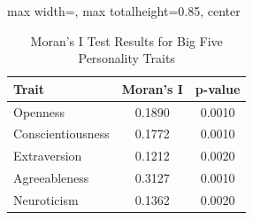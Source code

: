 \begin{table}[htbp]
\centering
\caption{Moran's I Test Results for Big Five Personality Traits}
\label{tab:morans_i_results}
\begin{adjustbox}{max width=\linewidth, max totalheight=0.85\textheight, center}
\begin{tabular}{lcc}
\toprule
Trait & Moran's I & p-value \\
\midrule
Openness & 0.1890 & 0.0010 \\
Conscientiousness & 0.1772 & 0.0010 \\
Extraversion & 0.1212 & 0.0020 \\
Agreeableness & 0.3127 & 0.0010 \\
Neuroticism & 0.1362 & 0.0020 \\
\bottomrule
\end{tabular}
\end{adjustbox}
\end{table}
